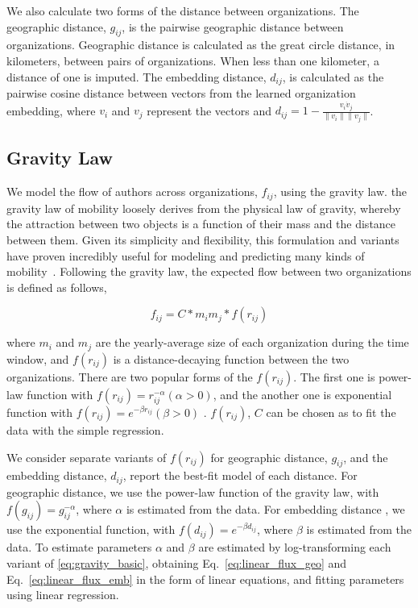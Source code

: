 \documentclass[12pt]{article} %
\begin{document}
We also calculate two forms of the distance between organizations. 
The geographic distance, $g_{ij}$, is the pairwise geographic distance between organizations.
Geographic distance is calculated as the great circle distance, in kilometers, between pairs of organizations. 
When less than one kilometer, a distance of one is imputed. 
The embedding distance, $d_{ij}$, is calculated as the pairwise cosine distance between vectors from the learned organization embedding, where $v_{i}$ and $v_{j}$ represent the vectors and $d_{ij} = 1 - \frac{v_{i} \dot v_{j}}{\lVert v_{i} \rVert \lVert v_{j} \rVert}$.

%
%
\subsection{Gravity Law}

We model the flow of authors across organizations, $f_{ij}$, using the gravity law. 
the gravity law of mobility loosely derives from the physical law of gravity, whereby the attraction between two objects is a function of their mass and the distance between them.
Given its simplicity and flexibility, this formulation and variants have proven incredibly useful for modeling and predicting many kinds of mobility~\cite{jung2008highwaygravity, curiel2018citygravity, lewer2008immigrationgravity, xia2005measlesgravity, truscott2012epidemicgravity, hong2016busgravity}.
Following the gravity law, the expected flow between two organizations is defined as follows,

\begin{equation}
    \label{eq:gravity_basic}
    f_{ij} = C*m_{i}m_{j}*f(r_{ij})
\end{equation}

where $m_{i}$ and $m_{j}$ are the yearly-average size of each organization during the time window, and $f(r_{ij})$ is a distance-decaying function  between the two organizations. There are two popular forms of the $f(r_{ij})$. The first one is power-law function with $f(r_{ij})= r^{-\alpha}_{ij}  (\alpha > 0)$, and the another one is exponential function with $f(r_{ij}) = e^{-\beta r_{ij}} (\beta > 0)$ \cite{chen2015distance}.  $f(r_{ij})$, $C$ can be chosen as to fit the data with the simple regression.

We consider separate variants of $f(r_{ij})$ for geographic distance, $g_{ij}$, and the embedding distance, $d_{ij}$, report the best-fit model of each distance.
For geographic distance, we use the power-law function of the gravity law, with $f(g_{ij})= g^{-\alpha}_{ij}$, where $\alpha$ is estimated from the data. 
For embedding distance , we use the exponential function, with $f(d_{ij}) = e^{-\beta d_{ij}}$, where $\beta$ is estimated from the data. 
To estimate parameters $\alpha$ and $\beta$ are estimated by log-transforming each variant of \ref{eq:gravity_basic}, obtaining Eq.~\ref{eq:linear_flux_geo} and Eq.~\ref{eq:linear_flux_emb} in the form of linear equations, and fitting parameters using linear regression. 
\end{document}
